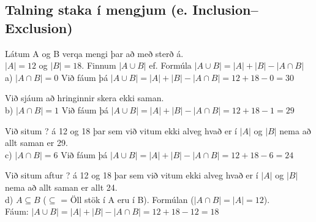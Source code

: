\setcounter{section}{8}
\setcounter{subsection}{4}
\subsection{Talning staka í mengjum (e. Inclusion– Exclusion)}
Látum A og B verqa mengi þar að með sterð á.\\
$|A| = 12$ og $|B| = 18$. Finnum $|A \cup B|$ ef. \quad Formúla $|A \cup B| = |A| + |B| - |A \cap B|$ \\
\indent a) $|A \cap B| = 0$ Við fáum þá $|A \cup B| = |A| + |B| - |A \cap B| = 12 + 18 - 0 = 30$
\begin{center}
\end{center}
\indent \indent Við sjáum að hringinnir skera ekki saman.\\
\indent b) $|A \cap B| = 1$ Við fáum þá $|A \cup B| = |A| + |B| - |A \cap B| = 12 + 18 - 1 = 29$
\begin{center}
\end{center}
\indent \indent Við situm ? á 12 og 18 þar sem við vitum ekki alveg hvað er í $|A|$ og $|B|$ nema \indent að allt saman er 29.\\
\indent c) $|A \cap B| = 6$ Við fáum þá $|A \cup B| = |A| + |B| - |A \cap B| = 12 + 18 - 6 = 24$
\begin{center}
\end{center}
\indent \indent Við situm aftur ? á 12 og 18 þar sem við vitum ekki alveg hvað er í $|A|$ og $|B|$ \indent nema að allt saman er allt 24.\\
\indent d) $A \subseteq B$ ($\subseteq$ = Öll stök í A eru í B). Formúlan ($|A \cap B| = |A| = 12$).\\
Fáum: $|A \cup B| = |A| + |B| - |A \cap B| = 12 + 18 - 12 = 18$
\begin{center}
\end{center}
\newpage

